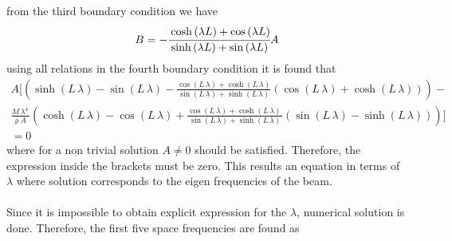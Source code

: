 \documentclass[]{report}
\begin{document}
from the third boundary condition we have
\begin{equation}
B=-\cfrac{\cosh\left(\lambda L\right)+\cos\left(\lambda L\right)}{\sinh\left(\lambda L\right)+\sin\left(\lambda L\right)}A
\label{eq:barel}
\end{equation}
using all relations in the fourth boundary condition it is found that
\begin{eqnarray*}
A\biggl[\left( \sinh\!\left(L\, \lambda\right)-\sin\!\left(L\, \lambda\right)  - \frac{{\cos\!\left(L\, \lambda\right) + \cosh\!\left(L\, \lambda\right)}}{\sin\!\left(L\, \lambda\right) + \sinh\!\left(L\, \lambda\right)}{\left(\cos\!\left(L\, \lambda\right) + \cosh\!\left(L\, \lambda\right)\right)}\right)-&&
\\ 
\frac{M\, {\lambda}^4\,}{{ \mathrm{\rho}\, A}} \left(\cosh\!\left(L\, \lambda\right) - \cos\!\left(L\, \lambda\right) + \frac{\cos\!\left(L\, \lambda\right) + \cosh\!\left(L\, \lambda\right)\, }{\sin\!\left(L\, \lambda\right) + \sinh\!\left(L\, \lambda\right)}\left(\sin\!\left(L\, \lambda\right) - \sinh\!\left(L\, \lambda\right)\right)\right)\biggr]&&\\= 0&&
\end{eqnarray*}
where for a non trivial solution $A\neq 0$ should be satisfied. Therefore, the expression inside the brackets must be zero. This results an equation in terms of $\lambda$ where solution corresponds to the eigen frequencies of the beam. 
\\~\\
Since it is impossible to obtain explicit expression for the $\lambda$, numerical solution is done. Therefore, the first five space frequencies are found as
\end{document}
